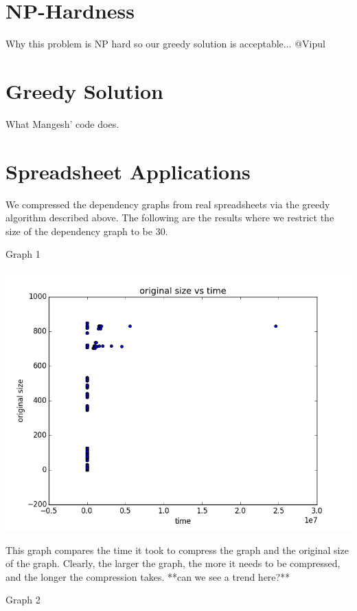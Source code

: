 \documentclass[11pt]{article}
\begin{document}
\section{NP-Hardness}

Why this problem is NP hard so our greedy solution is acceptable... @Vipul

\section{Greedy Solution}

What Mangesh' code does.

\section{Spreadsheet Applications}

We compressed the dependency graphs from real spreadsheets via the greedy algorithm described above. The following are the results where we restrict the size of the dependency graph to be 30.

Graph 1

\includegraphics[width=\textwidth]{sizevtime.png}

This graph compares the time it took to compress the graph and the original size of the graph. Clearly, the larger the graph, the more it needs to be compressed, and the longer the compression takes. **can we see a trend here?**

Graph 2
\end{document}
